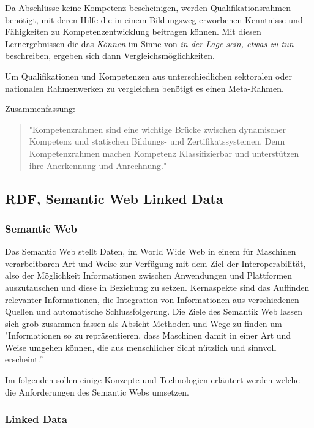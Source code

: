 Da Abschlüsse keine Kompetenz bescheinigen, werden Qualifikationsrahmen benötigt, mit deren Hilfe die in einem Bildungsweg erworbenen Kenntnisse und Fähigkeiten zu Kompetenzentwicklung beitragen können. Mit diesen Lernergebnissen die das \emph{Können} im Sinne von \emph{in der Lage sein, etwas zu tun} beschreiben, ergeben sich dann Vergleichsmöglichkeiten.
\vspace{1em}

Um Qualifikationen und Kompetenzen aus unterschiedlichen sektoralen oder nationalen Rahmenwerken zu vergleichen benötigt es einen Meta-Rahmen. 
\vspace{6em}

Zusammenfassung:

\begin{quote}
	"Kompetenzrahmen sind eine wichtige Brücke zwischen dynamischer Kompetenz und statischen Bildungs- und Zertifikatssystemen.
Denn Kompetenzrahmen machen Kompetenz Klassifizierbar und unterstützen ihre Anerkennung und Anrechnung."
\end{quote}


\subsection{RDF, Semantic Web  Linked Data}\label{semantic_web}
\subsubsection{Semantic Web}
Das Semantic Web stellt Daten, im World Wide Web in einem für Maschinen verarbeitbaren Art und Weise zur Verfügung mit dem Ziel der Interoperabilität, also der Möglichkeit Informationen zwischen Anwendungen und Plattformen auszutauschen und diese in Beziehung zu setzen. Kernaspekte sind das Auffinden relevanter Informationen, die Integration von Informationen aus verschiedenen Quellen und automatische Schlussfolgerung. Die Ziele des Semantik Web lassen sich grob zusammen fassen als Absicht Methoden und Wege zu finden um "Informationen so zu repräsentieren, dass Maschinen damit in einer Art und Weise umgehen können, die aus menschlicher Sicht nützlich und sinnvoll erscheint.”\cite[12]{Hitzler2007}\newline
 
Im folgenden sollen einige Konzepte und Technologien erläutert werden welche die Anforderungen des Semantic Webs umsetzen.
 
\subsubsection{Linked Data}

